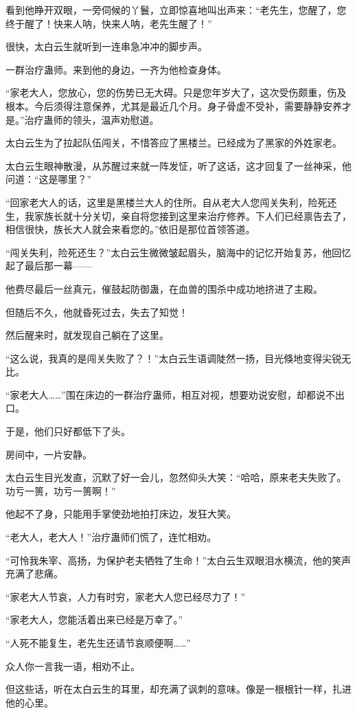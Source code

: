 \begin{this_body}
看到他睁开双眼，一旁伺候的丫鬟，立即惊喜地叫出声来：“老先生，您醒了，您终于醒了！快来人呐，快来人呐，老先生醒了！”

很快，太白云生就听到一连串急冲冲的脚步声。

一群治疗蛊师。来到他的身边，一齐为他检查身体。

“家老大人，您放心，您的伤势已无大碍。只是您年岁大了，这次受伤颇重，伤及根本。今后须得注意保养，尤其是最近几个月。身子骨虚不受补，需要静静安养才是。”治疗蛊师的领头，温声劝慰道。

太白云生为了拉起队伍闯关，不惜答应了黑楼兰。已经成为了黑家的外姓家老。

太白云生眼神散漫，从苏醒过来就一阵发怔，听了这话，这才回复了一丝神采，他问道：“这是哪里？”

“回家老大人的话，这里是黑楼兰大人的住所。自从老大人您闯关失利，险死还生，我家族长就十分关切，亲自将您接到这里来治疗修养。下人们已经禀告去了，相信很快，族长大人就会来看您的。”依旧是那位首领答道。

“闯关失利，险死还生？”太白云生微微皱起眉头，脑海中的记忆开始复苏，他回忆起了最后那一幕——

他费尽最后一丝真元，催鼓起防御蛊，在血兽的围杀中成功地挤进了主殿。

但随后不久，他就昏死过去，失去了知觉！

然后醒来时，就发现自己躺在了这里。

“这么说，我真的是闯关失败了？！”太白云生语调陡然一扬，目光倏地变得尖锐无比。

“家老大人……”围在床边的一群治疗蛊师，相互对视，想要劝说安慰，却都说不出口。

于是，他们只好都低下了头。

房间中，一片安静。

太白云生目光发直，沉默了好一会儿，忽然仰头大笑：“哈哈，原来老夫失败了。功亏一篑，功亏一篑啊！”

他起不了身，只能用手掌使劲地拍打床边，发狂大笑。

“老大人，老大人！”治疗蛊师们慌了，连忙相劝。

“可怜我朱宰、高扬，为保护老夫牺牲了生命！”太白云生双眼泪水横流，他的笑声充满了悲痛。

“家老大人节哀，人力有时穷，家老大人您已经尽力了！”

“家老大人，您能活着出来已经是万幸了。”

“人死不能复生，老先生还请节哀顺便啊……”

众人你一言我一语，相劝不止。

但这些话，听在太白云生的耳里，却充满了讽刺的意味。像是一根根针一样，扎进他的心里。


\end{this_body}

